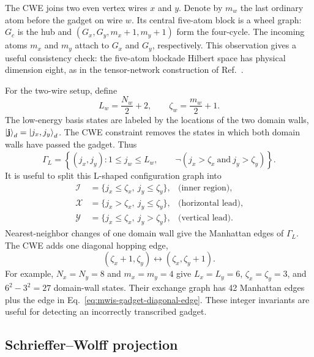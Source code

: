 The CWE joins two even vertex wires $x$ and $y$.  Denote by $m_w$ the last
ordinary atom before the gadget on wire $w$.  Its central five-atom block is a
wheel graph: $G_c$ is the hub and
$(G_x,G_y,m_x+1,m_y+1)$ form the four-cycle.  The incoming atoms $m_x$ and
$m_y$ attach to $G_x$ and $G_y$, respectively.  This observation gives a
useful consistency check: the five-atom blockade Hilbert space has physical
dimension eight, as in the tensor-network construction of
Ref.~\cite{bombieri2025quantum}.

For the two-wire setup, define
\begin{equation}
 L_w=\frac{N_w}{2}+2,
 \qquad
 \zeta_w=\frac{m_w}{2}+1 .
 \label{eq:mwis-length-zeta}
\end{equation}
The low-energy basis states are labeled by the locations of the two domain
walls, $\ket{\mathbf j}_d=\ket{j_x,j_y}_d$.  The CWE constraint removes the
states in which both domain walls have passed the gadget.  Thus
\begin{equation}
 \Gamma_L=
 \left\{(j_x,j_y):
 1\leq j_w\leq L_w,\qquad
 \neg(j_x>\zeta_x\ \text{and}\ j_y>\zeta_y)
 \right\}.
 \label{eq:mwis-L-domain}
\end{equation}
It is useful to split this L-shaped configuration graph into
\begin{subequations}
\begin{align}
 \mathcal I&=\{j_x\leq\zeta_x,\ j_y\leq\zeta_y\},
 &\text{(inner region)},\\
 \mathcal X&=\{j_x>\zeta_x,\ j_y\leq\zeta_y\},
 &\text{(horizontal lead)},\\
 \mathcal Y&=\{j_x\leq\zeta_x,\ j_y>\zeta_y\},
 &\text{(vertical lead)}.
\end{align}
\label{eq:mwis-three-regions}
\end{subequations}
Nearest-neighbor changes of one domain wall give the Manhattan edges of
$\Gamma_L$.  The CWE adds one diagonal hopping edge,
\begin{equation}
 (\zeta_x+1,\zeta_y)\longleftrightarrow
 (\zeta_x,\zeta_y+1).
 \label{eq:mwis-gadget-diagonal-edge}
\end{equation}
For example, $N_x=N_y=8$ and $m_x=m_y=4$ give
$L_x=L_y=6$, $\zeta_x=\zeta_y=3$, and
$6^2-3^2=27$ domain-wall states.  Their exchange graph has 42 Manhattan
edges plus the edge in Eq.~\eqref{eq:mwis-gadget-diagonal-edge}.  These integer
invariants are useful for detecting an incorrectly transcribed gadget.

\subsection{Schrieffer--Wolff projection}

